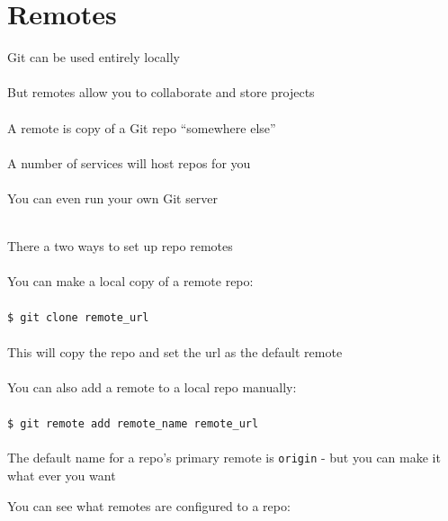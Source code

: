 \documentclass{beamer}
\begin{document}
\section{Remotes}
\begin{frame}[allowframebreaks]{\secname}
    Git can be used entirely locally\\~\\

    But remotes allow you to collaborate and store projects\\~\\

    A remote is copy of a Git repo ``somewhere else''\\~\\

    A number of services will host repos for you\\~\\

    You can even run your own Git server\\~\\

\framebreak

    There a two ways to set up repo remotes \\~\\

    You can make a local copy of a remote repo: \\~\\

    {\tt \$ git clone remote\_url} \\~\\

    This will copy the  repo and set the url as the default remote
    \\~\\

    You can also add a remote to a local repo manually: \\~\\

    {\tt \$ git remote add remote\_name remote\_url} \\~\\

    The default name for a repo's primary remote is {\tt origin} - but you can
    make it what ever you want

\framebreak
    
    You can see what remotes are configured to a repo: \\~\\


\end{frame}
\end{document}
